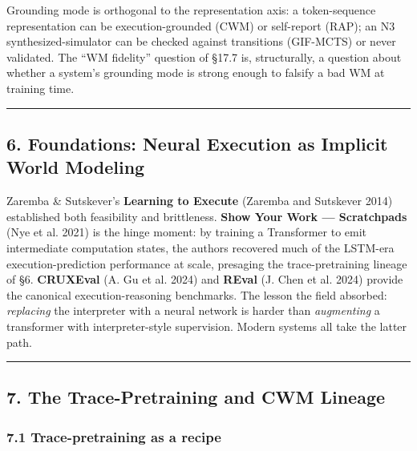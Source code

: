 \documentclass{article}
\begin{document}
Grounding mode is orthogonal to the representation axis: a
token-sequence representation can be execution-grounded (CWM) or
self-report (RAP); an N3 synthesized-simulator can be checked against
transitions (GIF-MCTS) or never validated. The ``WM fidelity'' question
of §17.7 is, structurally, a question about whether a system's grounding
mode is strong enough to falsify a bad WM at training time.

\begin{center}\rule{0.5\linewidth}{0.5pt}\end{center}

\hypertarget{foundations-neural-execution-as-implicit-world-modeling}{%
\subsection{6. Foundations: Neural Execution as Implicit World
Modeling}\label{foundations-neural-execution-as-implicit-world-modeling}}

Zaremba \& Sutskever's \textbf{Learning to Execute} (Zaremba and
Sutskever 2014) established both feasibility and brittleness.
\textbf{Show Your Work --- Scratchpads} (Nye et al. 2021) is the hinge
moment: by training a Transformer to emit intermediate computation
states, the authors recovered much of the LSTM-era execution-prediction
performance at scale, presaging the trace-pretraining lineage of §6.
\textbf{CRUXEval} (A. Gu et al. 2024) and \textbf{REval} (J. Chen et al.
2024) provide the canonical execution-reasoning benchmarks. The lesson
the field absorbed: \emph{replacing} the interpreter with a neural
network is harder than \emph{augmenting} a transformer with
interpreter-style supervision. Modern systems all take the latter path.

\begin{center}\rule{0.5\linewidth}{0.5pt}\end{center}

\hypertarget{the-trace-pretraining-and-cwm-lineage}{%
\subsection{7. The Trace-Pretraining and CWM
Lineage}\label{the-trace-pretraining-and-cwm-lineage}}

\hypertarget{trace-pretraining-as-a-recipe}{%
\subsubsection{7.1 Trace-pretraining as a
recipe}\label{trace-pretraining-as-a-recipe}}
\end{document}
